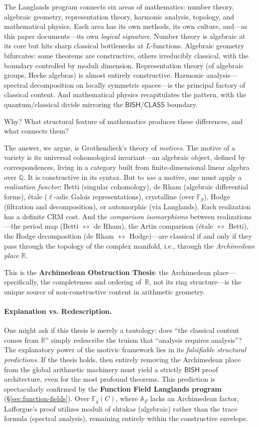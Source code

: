 \documentclass[11pt,a4paper]{article}
\theoremstyle{plain}
\theoremstyle{definition}
\newcommand{\BISH}{\textsf{BISH}}
\newcommand{\CLASS}{\textsf{CLASS}}
\newcommand{\Q}{\mathbb{Q}}
\newcommand{\R}{\mathbb{R}}
\newcommand{\F}{\mathbb{F}}
\newcommand{\A}{\mathbb{A}}
\begin{document}
The Langlands program connects six areas of mathematics: number theory, algebraic geometry, representation theory, harmonic analysis, topology, and mathematical physics. Each area has its own methods, its own culture, and---as this paper documents---its own \emph{logical signature}. Number theory is algebraic at its core but hits sharp classical bottlenecks at $L$-functions. Algebraic geometry bifurcates: some theorems are constructive, others irreducibly classical, with the boundary controlled by moduli dimension. Representation theory (of algebraic groups, Hecke algebras) is almost entirely constructive. Harmonic analysis---spectral decomposition on locally symmetric spaces---is the principal factory of classical content. And mathematical physics recapitulates the pattern, with the quantum/classical divide mirroring the $\BISH$/$\CLASS$ boundary.

Why? What structural feature of mathematics produces these differences, and what connects them?

The answer, we argue, is Grothendieck's theory of \emph{motives}. The motive of a variety is its universal cohomological invariant---an algebraic object, defined by correspondences, living in a category built from finite-dimensional linear algebra over $\Q$. It is constructive in its syntax. But to \emph{use} a motive, one must apply a \emph{realization functor}: Betti (singular cohomology), de Rham (algebraic differential forms), \'etale ($\ell$-adic Galois representations), crystalline (over $\F_p$), Hodge (filtration and decomposition), or automorphic (via Langlands). Each realization has a definite CRM cost. And the \emph{comparison isomorphisms} between realizations---the period map (Betti $\leftrightarrow$ de Rham), the Artin comparison (\'etale $\leftrightarrow$ Betti), the Hodge decomposition (de Rham $\leftrightarrow$ Hodge)---are classical if and only if they pass through the topology of the complex manifold, i.e., through the \emph{Archimedean place} $\R$.

This is the \textbf{Archimedean Obstruction Thesis}: the Archimedean place---specifically, the completeness and ordering of~$\R$, not its ring structure---is the unique source of non-constructive content in arithmetic geometry.

\paragraph{Explanation vs. Redescription.} One might ask if this thesis is merely a tautology: does ``the classical content comes from $\R$'' simply redescribe the truism that ``analysis requires analysis''? The explanatory power of the motivic framework lies in its \emph{falsifiable structural predictions}. If the thesis holds, then entirely removing the Archimedean place from the global arithmetic machinery must yield a strictly $\BISH$ proof architecture, even for the most profound theorems. This prediction is spectacularly confirmed by the \textbf{Function Field Langlands program} (\S\ref{sec:function-fields}). Over $\F_q(C)$, where $\A_F$ lacks an Archimedean factor, Lafforgue's proof utilizes moduli of shtukas (algebraic) rather than the trace formula (spectral analysis), remaining entirely within the constructive envelope.
\end{document}
